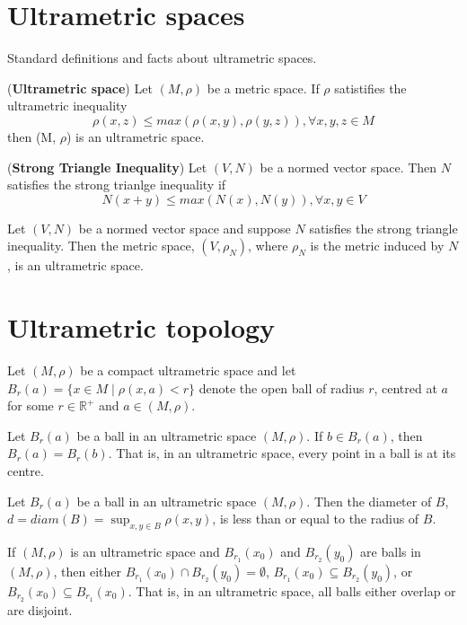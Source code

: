 
\section{Ultrametric spaces}
\noindent Standard definitions and facts about ultrametric spaces.

\begin{definition}
	(\textbf{Ultrametric space}) Let $(M, \rho)$ be a metric space. If $\rho$ satistifies the ultrametric inequality
	\[\rho(x,z) \leq max{(\rho(x,y), \rho(y,z))}, \forall x,y,z \in M\] 
	then (M, $\rho$) is an ultrametric space.
\end{definition}

\begin{definition}
	(\textbf{Strong Triangle Inequality}) Let $(V, N)$ be a normed vector space. Then $N$ satisfies the strong trianlge inequality if
	\[N(x + y) \leq max(N(x), N(y)), \forall x,y \in V \]
\end{definition}

\begin{proposition}
	Let $(V,N)$ be a normed vector space and suppose $N$ satisfies the strong triangle inequality. Then the metric space, $(V,\rho_N)$, where $\rho_N$ is the metric induced by $N$, is an ultrametric space.
\end{proposition}


\section{Ultrametric topology}
\noindent Let $(M, \rho)$ be a compact ultrametric space and let $B_r(a)=\{x \in M \mid \rho(x,a) < r\}$ denote the open ball of radius $r$, centred at $a$ for some $r \in \mathbb{R}^+$ and $a \in (M,\rho)$. 

\begin{proposition}
	Let $B_r(a)$ be a ball in an ultrametric space $(M,\rho)$. If $b \in B_r(a)$, then $B_r(a) = B_r(b)$. That is, in an ultrametric space, every point in a ball is at its centre.   
\end{proposition}

\begin{proposition}
	Let $B_r(a)$ be a ball in an ultrametric space $(M,\rho)$. Then the diameter of $B$, $d=diam(B)=\sup_{x,y \in B}{\rho(x,y)}$, is less than or equal to the radius of $B$.    
\end{proposition}

\begin{proposition}
	If $(M, \rho)$ is an ultrametric space and $B_{r_1}(x_0)$ and $B_{r_2}(y_0)$ are balls in $(M, \rho)$, then either $B_{r_1}(x_0) \cap B_{r_2}(y_0) = \emptyset$, $B_{r_1}(x_0) \subseteq B_{r_2}(y_0)$, or $B_{r_2}(x_0) \subseteq B_{r_1}(x_0)$. That is, in an ultrametric space, all balls either overlap or are disjoint.
\end{proposition}


